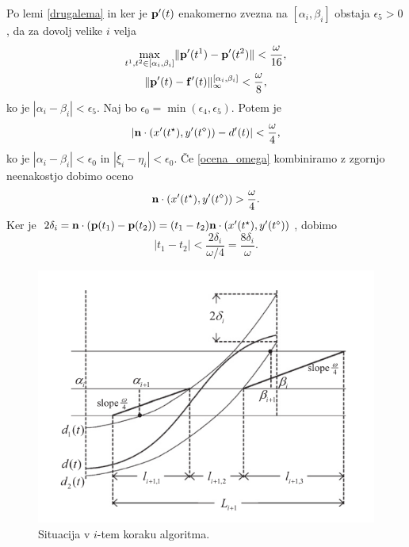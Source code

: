 Po lemi \ref{drugalema} in ker je ${\bf p'}(t)$ enakomerno zvezna na $[\alpha _i,\beta _i]$ obstaja $\epsilon _5 > 0$, da za dovolj velike $i$ velja 
\begin{gather*}
\max _{t^1,t^2\in [\alpha _i,\beta _i]} \lVert {\bf p}'(t^1) - {\bf p}'(t^2)\rVert < \frac{\omega}{16},\\
\lVert {\bf p}'(t) - {\bf f}'(t)\rVert _{\infty}^{[\alpha _i,\beta _i]} < \frac{\omega}{8},
\end{gather*}
ko je $|\alpha _i - \beta _i| < \epsilon _5$. Naj bo $\epsilon _0 = \min (\epsilon _4, \epsilon _5)$. Potem je 
$$
|{\bf n}\cdot (x'(t^\star), y'(t^\diamond)) - d'(t)| < \frac{\omega}{4},
$$
ko je $|\alpha _i - \beta _i| < \epsilon _0$ in $|\xi _i - \eta _i| < \epsilon _0$.
Če \ref{ocena_omega} kombiniramo z zgornjo neenakostjo dobimo oceno
$$
{\bf n}\cdot (x'(t^\star), y'(t^\diamond)) > \frac{\omega}{4}.
$$
Ker je $2\delta _i = {\bf n}\cdot({\bf p}(t_1) - {\bf p}(t_2)) = (t_1-t_2){\bf n}\cdot(x'(t^\star),y'(t^\diamond))$, dobimo
$$
|t_1-t_2| < \frac{2\delta _i}{\omega /4 } = \frac{8\delta _i}{\omega}.
$$


\endproof
\begin{figure}[!h]
  \begin{center}
    \includegraphics[width=0.7\linewidth]{1}
  \caption{Situacija v $i$-tem koraku algoritma.}
  \label{slika1}
  \end{center}

\end{figure}